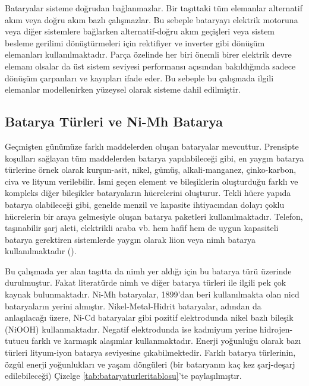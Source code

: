 Bataryalar sisteme doğrudan bağlanmazlar. Bir taşıttaki tüm elemanlar alternatif akım veya doğru akım bazlı çalışmazlar. Bu sebeple bataryayı elektrik motoruna veya diğer sistemlere bağlarken
alternatif-doğru akım geçişleri veya sistem besleme gerilimi dönüştürmeleri için rektifiyer ve inverter gibi dönüşüm elemanları kullanılmaktadır. Parça özelinde her biri 
önemli birer elektrik devre elemanı olsalar da üst sistem seviyesi performansı açısından bakıldığında sadece dönüşüm çarpanları ve kayıpları ifade eder. Bu sebeple bu çalışmada ilgili elemanlar modellenirken yüzeysel olarak sisteme dahil edilmiştir.

\subsection{Batarya Türleri ve Ni-Mh Batarya}
\label{nimhsection}

Geçmişten günümüze farklı maddelerden oluşan bataryalar mevcuttur. Prensipte koşulları sağlayan tüm maddelerden batarya yapılabileceği gibi, en yaygın 
batarya türlerine örnek olarak kurşun-asit, nikel, gümüş, alkali-manganez, çinko-karbon, civa ve lityum verilebilir. İsmi geçen element ve bileşiklerin oluşturduğu farklı ve kompleks diğer bileşikler
bataryaların hücrelerini oluşturur. Tekli hücre yapıda batarya olabileceği gibi, genelde menzil ve kapasite ihtiyacından dolayı çoklu hücrelerin bir araya gelmesiyle oluşan batarya paketleri kullanılmaktadır.
Telefon, taşınabilir şarj aleti, elektrikli araba vb. hem hafif hem de uygun kapasiteli batarya gerektiren sistemlerde yaygın olarak \acrfull{liion} veya \acrfull{nimh} batarya kullanılmaktadır (\cite{bataryaturunedir}).


Bu çalışmada yer alan taşıtta da \acrshort{nimh} yer aldığı için bu batarya türü üzerinde durulmuştur. Fakat literatürde \acrshort{nimh} ve diğer batarya türleri ile ilgili pek çok kaynak bulunmaktadır.
Ni-Mh bataryalar, 1899'dan beri kullanılmakta olan \acrfull{nicd} bataryaların yerini almıştır. Nikel-Metal-Hidrit bataryalar, adından da anlaşılacağı üzere, Ni-Cd bataryalar gibi pozitif elektrodunda nikel bazlı bileşik (NiOOH) kullanmaktadır.
Negatif elektrodunda ise kadmiyum yerine hidrojen-tutucu farklı ve karmaşık alaşımlar kullanmaktadır. Enerji yoğunluğu olarak bazı türleri lityum-iyon batarya seviyesine çıkabilmektedir.
Farklı batarya türlerinin, özgül enerji yoğunlukları ve yaşam döngüleri (bir bataryanın kaç kez şarj-deşarj edilebileceği) Çizelge \ref{tab:bataryaturleritablosu}'te paylaşılmıştır.

